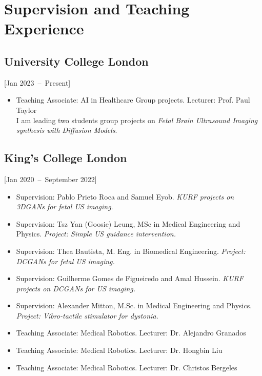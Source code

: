 \documentclass{mycv}
\begin{document}
\section{Supervision and Teaching Experience}

\subsection{University College London}[Jan 2023~--~Present]
\begin{itemize}
	\item Teaching Associate: AI in Healthcare Group projects. Lecturer: Prof. Paul Taylor 
	\\ I am leading two students group projects on \textit{Fetal Brain Ultrasound Imaging synthesis with Diffusion Models}.
\end{itemize}


\subsection{King's College London}[Jan 2020~--~September 2022]
\begin{itemize}
	\item 	Supervision: Pablo Prieto Roca and Samuel Eyob. 
		\textit{KURF projects on 3DGANs for fetal US imaging}. 
	\item 	Supervision: Tsz Yan (Goosie) Leung, MSc in Medical Engineering and Physics. 
		\textit{Project: Simple US guidance intervention.} 
	\item 	Supervision: Thea Bautista, M. Eng. in Biomedical Engineering. 
		\textit{Project: DCGANs for fetal US imaging.} 
	\item 	Supervision: Guilherme Gomes de Figueiredo and Amal Hussein. 
		\textit{KURF projects on DCGANs for US imaging.}
	\item 	Supervision: Alexander Mitton, M.Sc. in Medical Engineering and Physics. 
		\textit{Project: Vibro-tactile stimulator for dystonia.}
	\item Teaching Associate: Medical Robotics. Lecturer: Dr. Alejandro Granados 
	\item Teaching Associate: Medical Robotics. Lecturer: Dr. Hongbin Liu 
	\item Teaching Associate: Medical Robotics. Lecturer: Dr. Christos Bergeles 
\end{itemize}
\end{document}
